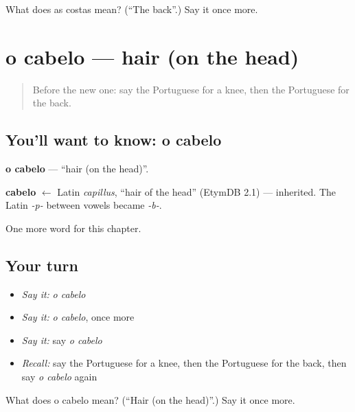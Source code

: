 \begin{tcolorbox}[breakable,colback=teal!4,colframe=teal!35!black,title={Before you move on}]
What does as costas mean? (\textquotedblleft{}The back\textquotedblright{}.) Say it once more.
\end{tcolorbox}
\section[o cabelo]{o cabelo — hair (on the head)}

\label{lesson:PT-C32-cabelo}



\begin{quote}
Before the new one: say the Portuguese for a knee, then the Portuguese for the back.
\end{quote}

\subsection*{You'll want to know: o cabelo}
\textbf{o cabelo} — \textquotedblleft{}hair (on the head)\textquotedblright{}.

\begin{cousinweb}
\textbf{cabelo} $\leftarrow$ Latin \emph{capillus}, \textquotedblleft{}hair of the head\textquotedblright{} (EtymDB 2.1) — inherited. The Latin \emph{-p-} between vowels became \emph{-b-}.
\end{cousinweb}

\begin{grammarlens}[title={What you've built}]
One more word for this chapter.
\end{grammarlens}

\subsection*{Your turn}
\begin{itemize}
\raggedright
  \item \emph{Say it:} \emph{o cabelo}
  \item \emph{Say it:} \emph{o cabelo}, once more
  \item \emph{Say it:} say \emph{o cabelo}
  \item \emph{Recall:} say the Portuguese for a knee, then the Portuguese for the back, then say \emph{o cabelo} again
\end{itemize}

\begin{tcolorbox}[breakable,colback=teal!4,colframe=teal!35!black,title={Before you move on}]
What does o cabelo mean? (\textquotedblleft{}Hair (on the head)\textquotedblright{}.) Say it once more.
\end{tcolorbox}
